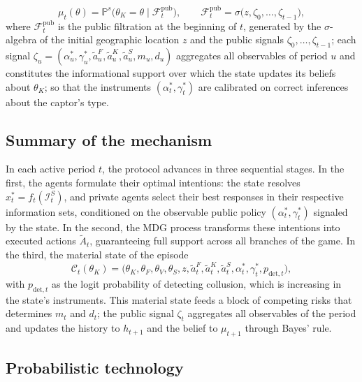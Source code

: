\documentclass[review,authoryear,12pt]{elsarticle}
\theoremstyle{plain}
\theoremstyle{definition}
\newcommand{\Prob}{\mathbb{P}}
\newcommand{\1}{\mathbf{1}}
\begin{document}
\[
\mu_t(\theta)=\Prob^s\!\bigl(\theta_K=\theta\mid\mathcal{F}_t^{\mathrm{pub}}\bigr),\qquad \mathcal{F}_t^{\mathrm{pub}}=\sigma\bigl(z,\zeta_0,\ldots,\zeta_{t-1}\bigr),
\]
where $\mathcal{F}_t^{\mathrm{pub}}$ is the public filtration at the beginning of $t$, generated by the $\sigma$-algebra of the initial geographic location $z$ and the public signals $\zeta_0,\ldots,\zeta_{t-1}$; each signal $\zeta_u=(\alpha_u^\ast,\gamma_u^\ast,\tilde{a}_u^F,\tilde{a}_u^K,\tilde{a}_u^S,m_u,d_u)$ aggregates all observables of period $u$ and constitutes the informational support over which the state updates its beliefs about $\theta_K$; so that the instruments $(\alpha_t^\ast,\gamma_t^\ast)$ are calibrated on correct inferences about the captor's type.

\subsection{Summary of the mechanism}\label{subsec:resumen-mecanismo}

In each active period $t$, the protocol advances in three sequential stages. In the first, the agents formulate their optimal intentions: the state resolves $x_t^\ast=f_t(\mathcal{I}_t^S)$, and private agents select their best responses in their respective information sets, conditioned on the observable public policy $(\alpha_t^\ast,\gamma_t^\ast)$ signaled by the state. In the second, the MDG process transforms these intentions into executed actions $\tilde{A}_t$, guaranteeing full support across all branches of the game. In the third, the material state of the episode
\[
\mathcal{C}_t(\theta_K)=\bigl(\theta_K,\theta_F,\theta_V,\theta_S,z,\tilde{a}_t^F,\tilde{a}_t^K,\tilde{a}_t^S,\alpha_t^\ast,\gamma_t^\ast,p_{\mathrm{det},t}\bigr),
\]
with $p_{\mathrm{det},t}$ as the logit probability of detecting collusion, which is increasing in the state's instruments. This material state feeds a block of competing risks that determines $m_t$ and $d_t$; the public signal $\zeta_t$ aggregates all observables of the period and updates the history to $h_{t+1}$ and the belief to $\mu_{t+1}$ through Bayes' rule.

\subsection{Probabilistic technology}\label{subsec:prob-tech}
\end{document}
